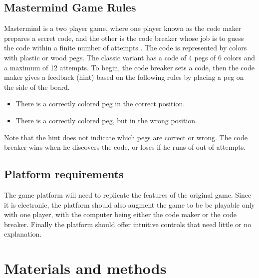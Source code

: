 \documentclass[a4paper, 11pt]{article}
\begin{document}
\subsection{Mastermind Game Rules}
Mastermind is a two player game, where one player known as the code
maker prepares a secret code, and the other is the code breaker whose
job is to guess the code within a finite number of attempts \cite{wikistatemachine}. The code is
represented by colors with plastic or wood pegs. The classic variant has
a code of 4 pegs of 6 colors and a maximum of 12 attempts. To begin, the
code breaker sets a code, then the code maker gives a feedback (hint)
based on the following rules by placing a peg on the side of the board.
\begin{itemize}
    \item There is a correctly colored peg in the correct position.
    \item There is a correctly colored peg, but in the wrong position.
\end{itemize}
Note that the hint does not indicate which pegs are correct or wrong.
The code breaker wins when he discovers the code, or loses if he runs of
out of attempts.
\endgroup

\subsection{Platform requirements}
The game platform will need to replicate the features of the original
game. Since it is electronic, the platform should also augment the game
to be be playable only with one player, with the computer being either
the code maker or the code breaker. Finally the platform should offer
intuitive controls that need little or no explanation.

\section{Materials and methods}
\end{document}
